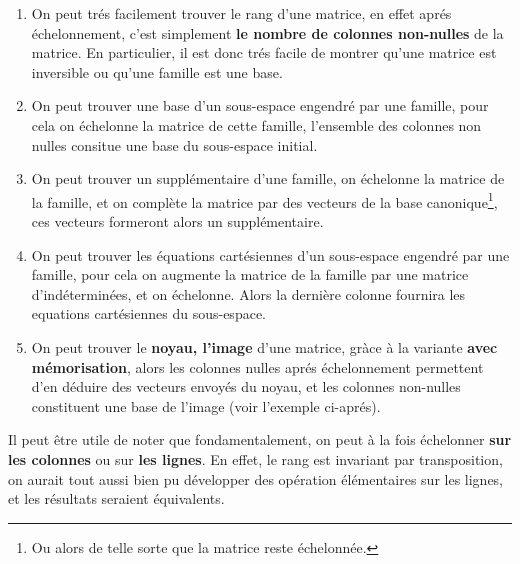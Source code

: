 \begin{enumerate}
   \item On peut trés facilement trouver le rang d'une matrice, en effet aprés échelonnement, c'est simplement \textbf{le nombre de colonnes non-nulles} de la matrice. En particulier, il est donc trés facile de montrer qu'une matrice est inversible ou qu'une famille est une base.
   \item On peut trouver une base d'un sous-espace engendré par une famille, pour cela on échelonne la matrice de cette famille, l'ensemble des colonnes non nulles consitue une base du sous-espace initial.
   \item On peut trouver un supplémentaire d'une famille, on échelonne la matrice de la famille, et on complète la matrice par des vecteurs de la base canonique\footnote[2]{Ou alors de telle sorte que la matrice reste échelonnée.}, ces vecteurs formeront alors un supplémentaire.
   \item On peut trouver les équations cartésiennes d'un sous-espace engendré par une famille, pour cela on augmente la matrice de la famille par une matrice d'indéterminées, et on échelonne. Alors la dernière colonne fournira les equations cartésiennes du sous-espace.
   \item On peut trouver le \textbf{noyau, l'image} d'une matrice, gràce à la variante \textbf{avec mémorisation}, alors les colonnes nulles aprés échelonnement permettent d'en déduire des vecteurs envoyés du noyau, et les colonnes non-nulles constituent une base de l'image (voir l'exemple ci-aprés).
\end{enumerate}
Il peut être utile de noter que fondamentalement, on peut à la fois échelonner \textbf{sur les colonnes} ou sur \textbf{les lignes}. En effet, le rang est invariant par transposition, on aurait tout aussi bien pu développer des opération élémentaires sur les lignes, et les résultats seraient équivalents.

\pagebreak

